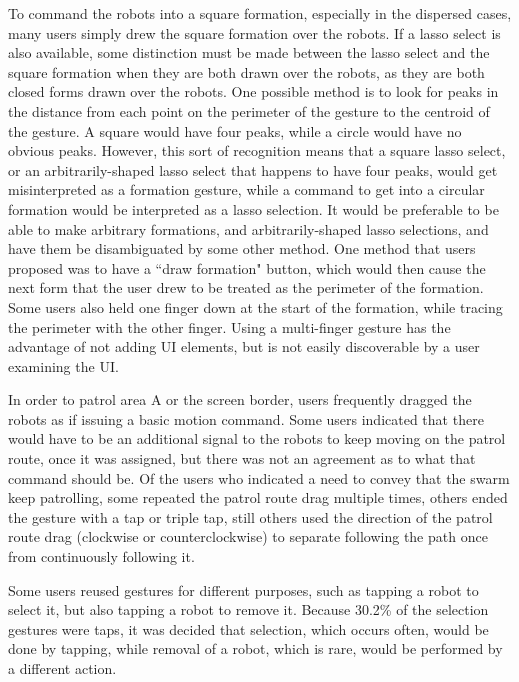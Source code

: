 To command the robots into a square formation, especially in the dispersed cases, many users simply drew the square formation over the robots.
If a lasso select is also available, some distinction must be made between the lasso select and the square formation when they are both drawn over the robots, as they are both closed forms drawn over the robots.
One possible method is to look for peaks in the distance from each point on the perimeter of the gesture to the centroid of the gesture. 
A square would have four peaks, while a circle would have no obvious peaks. 
However, this sort of recognition means that a square lasso select, or an arbitrarily-shaped lasso select that happens to have four peaks, would get misinterpreted as a formation gesture, while a command to get into a circular formation would be interpreted as a lasso selection. 
It would be preferable to be able to make arbitrary formations, and arbitrarily-shaped lasso selections, and have them be disambiguated by some other method. 
One method that users proposed was to have a ``draw formation" button, which would then cause the next form that the user drew to be treated as the perimeter of the formation. 
Some users also held one finger down at the start of the formation, while tracing the perimeter with the other finger. 
Using a multi-finger gesture has the advantage of not adding UI elements, but is not easily discoverable by a user examining the UI. 

In order to patrol area A or the screen border, users frequently dragged the robots as if issuing a basic motion command. 
Some users indicated that there would have to be an additional signal to the robots to keep moving on the patrol route, once it was assigned, but there was not an agreement as to what that command should be. 
Of the users who indicated a need to convey that the swarm keep patrolling, some repeated the patrol route drag multiple times, others ended the gesture with a tap or triple tap, still others used the direction of the patrol route drag (clockwise or counterclockwise) to separate following the path once from continuously following it. 

Some users reused gestures for different purposes, such as tapping a robot to select it, but also tapping a robot to remove it.
Because 30.2\% of the selection gestures were taps, it was decided that selection, which occurs often, would be done by tapping, while removal of a robot, which is rare, would be performed by a different action. 

